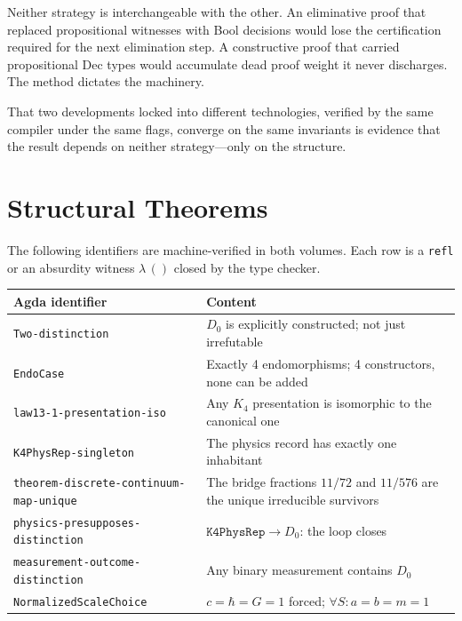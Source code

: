 \documentclass[11pt,a4paper]{article}
\theoremstyle{definition}
\begin{document}
Neither strategy is interchangeable with the other.  An eliminative proof that
replaced propositional witnesses with Bool decisions would lose the certification
required for the next elimination step.  A constructive proof that carried
propositional Dec types would accumulate dead proof weight it never discharges.
The method dictates the machinery.

That two developments locked into different technologies, verified by the same
compiler under the same flags, converge on the same invariants is evidence that
the result depends on neither strategy---only on the structure.

\section{Structural Theorems}
\label{sec:structural}

The following identifiers are machine-verified in both volumes.  Each row is
a \texttt{refl} or an absurdity witness $\lambda\,()$ closed by the type
checker.

\begin{center}
\small
\renewcommand{\arraystretch}{1.3}
\begin{tabular}{@{}lp{8cm}@{}}
\toprule
\textbf{Agda identifier} & \textbf{Content} \\
\midrule
\texttt{Two-distinction}                          & $D_0$ is explicitly constructed; not just irrefutable \\
\texttt{EndoCase}                                 & Exactly 4 endomorphisms; 4 constructors, none can be added \\
\texttt{law13-1-presentation-iso}                 & Any $K_4$ presentation is isomorphic to the canonical one \\
\texttt{K4PhysRep-singleton}                      & The physics record has exactly one inhabitant \\
\texttt{theorem-discrete-continuum-map-unique}    & The bridge fractions $11/72$ and $11/576$ are the unique irreducible survivors \\
\texttt{physics-presupposes-distinction}          & $\mathtt{K4PhysRep} \to D_0$: the loop closes \\
\texttt{measurement-outcome-distinction}          & Any binary measurement contains $D_0$ \\
\texttt{NormalizedScaleChoice}                    & $c = \hbar = G = 1$ forced; $\forall S: a = b = m = 1$ \\
\bottomrule
\end{tabular}
\end{center}
\end{document}

